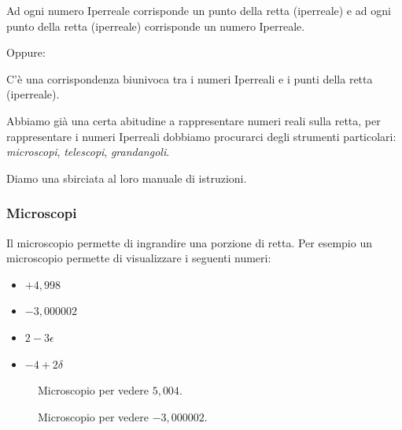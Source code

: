 \begin{postulato}
Ad ogni numero Iperreale corrisponde un punto della retta (iperreale) e ad 
ogni punto della retta (iperreale) corrisponde un numero Iperreale.
\end{postulato}

Oppure:

\begin{postulato}
C'è una corrispondenza biunivoca tra i numeri Iperreali e 
i punti della retta (iperreale).
\end{postulato}

Abbiamo già una certa abitudine a rappresentare numeri reali sulla retta, 
per rappresentare i numeri Iperreali dobbiamo procurarci degli strumenti 
particolari: \emph{microscopi}, \emph{telescopi}, \emph{grandangoli}.

Diamo una sbirciata al loro manuale di istruzioni.

\subsubsection{Microscopi}
\label{subsec:insnum_microscopio}

Il microscopio permette di ingrandire una porzione di retta. 
Per esempio un microscopio permette di visualizzare i seguenti numeri:

\begin{multicols}{4}
\begin{itemize}[nosep]
 \item $+4,998$
 \item $-3,000002$
 \item $2-3\epsilon$
 \item $-4+2\delta$
\end{itemize}
\end{multicols}

\begin{figure}[h]
\begin{inaccessibleblock}

\begin{minipage}{.48\linewidth}
 \begin{center}
\scalebox{0.8}{\microscopioa}
 \end{center}
\caption{Microscopio per vedere \(5,004\).} \label{fig:microscopioa}
\end{minipage}
\hfill
\begin{minipage}{.48\linewidth}
 \begin{center}
\scalebox{0.8}{\microscopiob}
 \end{center}
\caption{Microscopio per vedere \(-3,000002\).} \label{fig:microscopiob}
\end{minipage}

\end{inaccessibleblock}
\end{figure}
 
